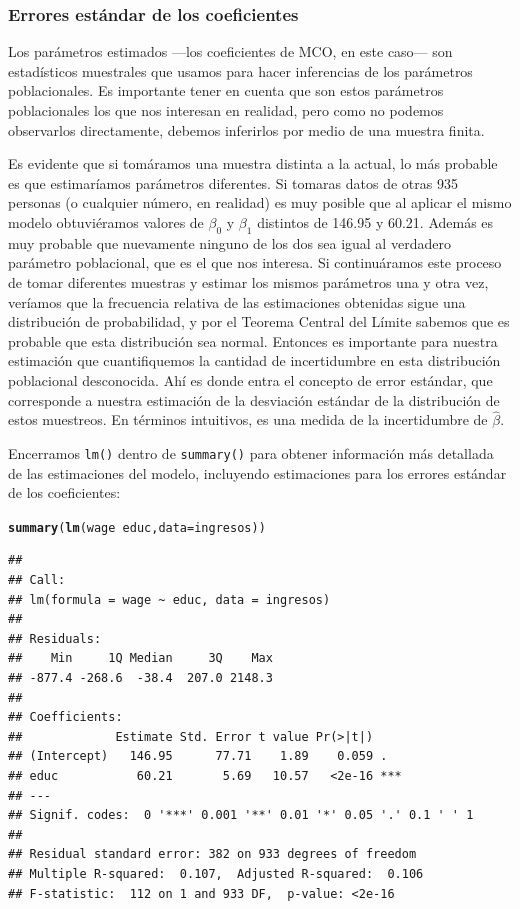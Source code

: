 \documentclass{report}\usepackage[]{graphicx}\usepackage[]{color}
\makeatletter
\newcommand{\hlopt}[1]{\textcolor[rgb]{0,0,0}{#1}}%
\newcommand{\hlstd}[1]{\textcolor[rgb]{0.345,0.345,0.345}{#1}}%
\newcommand{\hlkwc}[1]{\textcolor[rgb]{0.333,0.667,0.333}{#1}}%
\newcommand{\hlkwd}[1]{\textcolor[rgb]{0.737,0.353,0.396}{\textbf{#1}}}%
\newenvironment{kframe}{%
 \def\at@end@of@kframe{}%
 \ifinner\ifhmode%
  \def\at@end@of@kframe{\end{minipage}}%
  \begin{minipage}{\columnwidth}%
 \fi\fi%
 \def\FrameCommand##1{\hskip\@totalleftmargin \hskip-\fboxsep
 \colorbox{shadecolor}{##1}\hskip-\fboxsep
     \hskip-\linewidth \hskip-\@totalleftmargin \hskip\columnwidth}%
 \MakeFramed {\advance\hsize-\width
   \@totalleftmargin\z@ \linewidth\hsize
   \@setminipage}}%
 {\par\unskip\endMakeFramed%
 \at@end@of@kframe}
\newenvironment{knitrout}{}{} %
\makeatother
\begin{document}
\subsubsection{Errores estándar de los coeficientes}

Los parámetros estimados ---los coeficientes de MCO, en este caso--- son estadísticos muestrales que usamos para hacer inferencias de los parámetros poblacionales. Es importante tener en cuenta que son estos parámetros poblacionales los que nos interesan en realidad, pero como no podemos observarlos directamente, debemos inferirlos por medio de una muestra finita.

Es evidente que si tomáramos una muestra distinta a la actual, lo más probable es que estimaríamos parámetros diferentes. Si tomaras datos de otras 935 personas (o cualquier número, en realidad) es muy posible que al aplicar el mismo modelo obtuviéramos valores de $\beta_0$ y $\beta_1$ distintos de 146.95 y 60.21. Además es muy probable que nuevamente ninguno de los dos sea igual al verdadero parámetro poblacional, que es el que nos interesa. Si continuáramos este proceso de tomar diferentes muestras y estimar los mismos parámetros una y otra vez, veríamos que la frecuencia relativa de las estimaciones obtenidas sigue una distribución de probabilidad, y por el Teorema Central del Límite sabemos que es probable que esta distribución sea normal. Entonces es importante para nuestra estimación que cuantifiquemos la cantidad de incertidumbre en esta distribución poblacional desconocida. Ahí es donde entra el concepto de error estándar, que corresponde a nuestra estimación de la desviación estándar de la distribución de estos muestreos. En términos intuitivos, es una medida de la incertidumbre de $\hat\beta$.

Encerramos \verb|lm()| dentro de \verb|summary()| para obtener información más detallada de las estimaciones del modelo, incluyendo estimaciones para los errores estándar de los coeficientes:

\begin{knitrout}
\color{fgcolor}\begin{kframe}
\begin{alltt}
\hlkwd{summary}\hlstd{(}\hlkwd{lm}\hlstd{(wage} \hlopt{~} \hlstd{educ,} \hlkwc{data} \hlstd{= ingresos))}
\end{alltt}
\begin{verbatim}
## 
## Call:
## lm(formula = wage ~ educ, data = ingresos)
## 
## Residuals:
##    Min     1Q Median     3Q    Max 
## -877.4 -268.6  -38.4  207.0 2148.3 
## 
## Coefficients:
##             Estimate Std. Error t value Pr(>|t|)    
## (Intercept)   146.95      77.71    1.89    0.059 .  
## educ           60.21       5.69   10.57   <2e-16 ***
## ---
## Signif. codes:  0 '***' 0.001 '**' 0.01 '*' 0.05 '.' 0.1 ' ' 1
## 
## Residual standard error: 382 on 933 degrees of freedom
## Multiple R-squared:  0.107,	Adjusted R-squared:  0.106 
## F-statistic:  112 on 1 and 933 DF,  p-value: <2e-16
\end{verbatim}
\end{kframe}
\end{knitrout}
\end{document}
